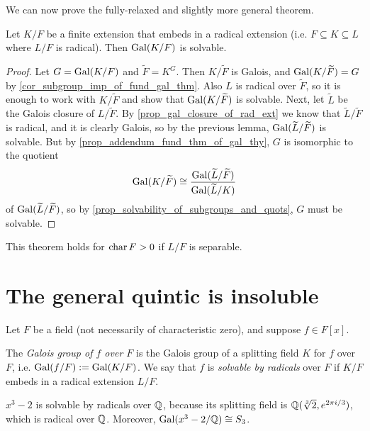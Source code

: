 We can now prove the fully-relaxed and slightly more general theorem.

\begin{theorem}
\label{thm_gal_grp_solvable}
    Let $K/F$ be a finite extension that embeds in a radical extension (i.e. $F \subseteq K \subseteq L$ where $L/F$ is radical). Then $\operatorname{Gal}(K/F)$ is solvable.
\end{theorem}

\begin{proof}
    Let $G = \operatorname{Gal}(K/F)$ and $\widetilde{F} = K^G$. Then $K/\widetilde{F}$ is Galois, and $\operatorname{Gal}(K/\widetilde{F}) = G$ by \cref{cor_subgroup_imp_of_fund_gal_thm}. Also $L$ is radical over $\widetilde{F}$, so it is enough to work with $K/\widetilde{F}$ and show that $\operatorname{Gal}(K/\widetilde{F})$ is solvable. Next, let $\widetilde{L}$ be the Galois closure of $L/\widetilde{F}$. By \cref{prop_gal_closure_of_rad_ext} we know that $\widetilde{L}/\widetilde{F}$ is radical, and it is clearly Galois, so by the previous lemma, $\operatorname{Gal}(\widetilde{L}/\widetilde{F})$ is solvable. But by \cref{prop_addendum_fund_thm_of_gal_thy}, $G$ is isomorphic to the quotient
    \[
        \operatorname{Gal}(K/\widetilde{F}) \cong \frac{\operatorname{Gal}(\widetilde{L}/\widetilde{F})}{\operatorname{Gal}(\widetilde{L}/K)}
    \]
    of $\operatorname{Gal}(\widetilde{L}/\widetilde{F})$, so by \cref{prop_solvability_of_subgroups_and_quots}, $G$ must be solvable.
\end{proof}

\begin{remark}
    This theorem holds for $\operatorname{char}{{F}} > 0$ if $L/F$ is separable.
\end{remark}

\section{The general quintic is insoluble}

Let $F$ be a field (not necessarily of characteristic zero), and suppose $f \in F[x]$.

\begin{definition}
    The \emph{Galois group of $f$ over $F$} is the Galois group of a splitting field $K$ for $f$ over $F$, i.e. $\operatorname{Gal}(f/F) := \operatorname{Gal}(K/F)$. We say that $f$ is \emph{solvable by radicals} over $F$ if $K/F$ embeds in a radical extension $L/F$.
\end{definition}

\begin{example}
    $x^3 - 2$ is solvable by radicals over $\mathbb{{Q}}$, because its splitting field is $\mathbb{{Q}}(\sqrt[3]{2}, e^{2\pi i/3})$, which is radical over $\mathbb{{Q}}$. Moreover, $\operatorname{Gal}(x^3 - 2/\mathbb{{Q}}) \cong S_3$.
\end{example}

